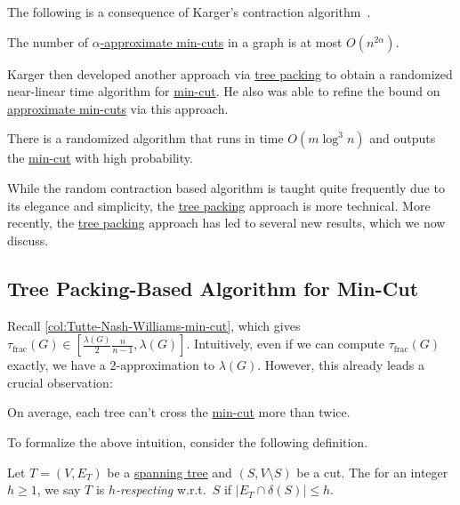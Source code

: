 The following is a consequence of Karger's contraction algorithm~\cite{karger1995random}.

\begin{theorem}\label{thm:number-approximate-min-cut}
	The number of \hyperref[def:approximate-min-cut]{\(\alpha \)-approximate min-cuts} in a graph is at most \(O(n^{2 \alpha })\).
\end{theorem}

Karger then developed another approach via \hyperref[prb:tree-packing]{tree packing} to obtain a randomized near-linear time algorithm for \hyperref[prb:global-min-cut]{min-cut}. He also was able to refine the bound on \hyperref[thm:number-approximate-min-cut]{approximate min-cuts} via this approach.

\begin{theorem}\label{thm:Karger-tree-packing-based-min-cut}
	There is a randomized algorithm that runs in time \(O(m \log ^3 n)\) and outputs the \hyperref[prb:global-min-cut]{min-cut} with high probability.
\end{theorem}

While the random contraction based algorithm is taught quite frequently due to its elegance and simplicity, the \hyperref[prb:tree-packing]{tree packing} approach is more technical. More recently, the \hyperref[prb:tree-packing]{tree packing} approach has led to several new results, which we now discuss.

\subsection{Tree Packing-Based Algorithm for Min-Cut}
Recall \autoref{col:Tutte-Nash-Williams-min-cut}, which gives \(\tau _{\text{frac} }(G) \in [\frac{\lambda (G)}{2} \frac{n}{n-1}, \lambda (G)]\). Intuitively, even if we can compute \(\tau _{\text{frac} }(G)\) exactly, we have a \(2\)-approximation to \(\lambda (G)\). However, this already leads a crucial observation:

\begin{intuition}
	On average, each tree can't cross the \hyperref[prb:global-min-cut]{min-cut} more than twice.
\end{intuition}

To formalize the above intuition, consider the following definition.

\begin{definition}[Respecting]\label{def:respect}
	Let \(T = (V, E_T)\) be a \hyperref[def:spanning-tree]{spanning tree} and \((S, V\setminus S)\) be a cut. The for an integer \(h \geq 1\), we say \(T\) is \emph{\(h\)-respecting} w.r.t.\ \(S\) if \(\lvert E_T \cap \delta (S) \rvert \leq h\).
\end{definition}


